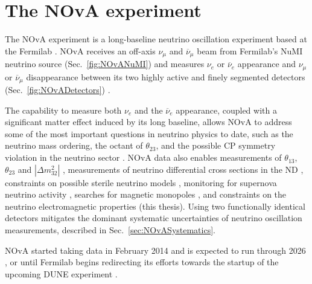 \chapter{The NOvA experiment}\label{sec:NOvA}

The \gls{NOvA} \cite{NOvAWebsite} experiment is a long-baseline neutrino oscillation experiment based at the \gls{Fermilab}
\cite{FNALWebsite}. \gls{NOvA} receives an off-axis $\nu_\mu$ and $\overline{\nu}_\mu$ beam from \gls{Fermilab}'s \gls{NuMI} neutrino source (Sec.~\ref{fig:NOvANuMI}) and measures $\nu_e$ or $\overline{\nu}_e$ appearance and $\nu_\mu$ or $\overline{\nu}_\mu$ disappearance between its two highly active and finely segmented detectors (Sec.~\ref{fig:NOvADetectors}) \cite{PhysicsOfNOvA.pdf}. 

The capability to measure both $\nu_e$ and the $\overline{\nu}_e$ appearance, coupled with a significant matter effect induced by its long baseline, allows \gls{NOvA} to address some of the most important questions in neutrino physics to date, such as the neutrino mass ordering, the octant of $\theta_{23}$, and the possible \gls{CP} symmetry violation in the neutrino sector \cite{PhysicsOfNOvA.pdf,NOvAStatusAndOutlook.pdf,FirstNOvAResult.pdf,2019NOvAFHCRHCResults.pdf,NOvAResults2021.pdf}. \gls{NOvA} data also enables measurements of $\theta_{13}$, $\theta_{23}$ and $\left|\Delta m^2_{32}\right|$ \cite{PhysicsOfNOvA.pdf}, measurements of neutrino differential cross sections in the \gls{ND} \cite{NOvANCPi0XSecMeasurement2019.pdf, NOvANumuCCXSexMeasurement2023.pdf, NOvANueCCXSecMeasurement2023.pdf, NOvANuMuCCPi0XSecMeasurement2023.pdf}, constraints on possible sterile neutrino models \cite{NOvASterilesFHCResults2017.pdf, NOvASterilesFHCRHCResults2021.pdf}, monitoring for supernova neutrino activity \cite{NOvASupernovaMeasurements2020.pdf, NOvASupernovaCoincidenceMeasurements2021.pdf}, searches for magnetic monopoles \cite{NOvASlowMagMonopoles2021.pdf}, and constraints on the neutrino electromagnetic properties (this thesis). Using two functionally identical detectors mitigates the dominant systematic uncertainties of neutrino oscillation measurements, described in Sec.~\ref{sec:NOvASystematics}.


\gls{NOvA} started taking data in February 2014 and is expected to run through 2026 \cite{NOvAHalfTimeOverview2022.pdf}, or until \gls{Fermilab} begins redirecting its efforts towards the startup of the upcoming \gls{DUNE} experiment \cite{NOvAPhysicsThrough2025SnowmassLOI.pdf}.

